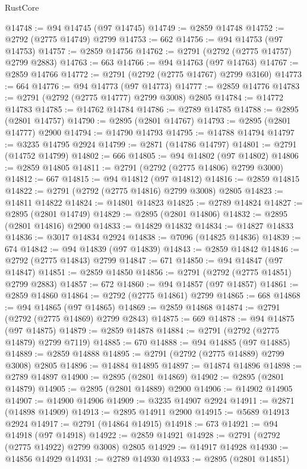 \begin{lexlean}{RustCore}
\begin{coremodule}
@14748 := @94 @14745 (@97 @14745)
@14749 := @2859 @14748
@14752 := @2792 (@2775 @14749) @2799
@14753 := 662
@14756 := @94 @14753 (@97 @14753)
@14757 := @2859 @14756
@14762 := @2791 (@2792 (@2775 @14757) @2799 @2883)
@14763 := 663
@14766 := @94 @14763 (@97 @14763)
@14767 := @2859 @14766
@14772 := @2791 (@2792 (@2775 @14767) @2799 @3160)
@14773 := 664
@14776 := @94 @14773 (@97 @14773)
@14777 := @2859 @14776
@14783 := @2791 (@2792 (@2775 @14777) @2799 @3008) @2805
@14784 := @14772 @14783
@14785 := @14762 @14784
@14786 := @2789 @14785
@14788 := @2895 (@2801 @14757)
@14790 := @2895 (@2801 @14767)
@14793 := @2895 (@2801 @14777) @2900
@14794 := @14790 @14793
@14795 := @14788 @14794
@14797 := @3235 @14795 @2924
@14799 := @2871 (@14786 @14797)
@14801 := @2791 (@14752 @14799)
@14802 := 666
@14805 := @94 @14802 (@97 @14802)
@14806 := @2859 @14805
@14811 := @2791 (@2792 (@2775 @14806) @2799 @3000)
@14812 := 667
@14815 := @94 @14812 (@97 @14812)
@14816 := @2859 @14815
@14822 := @2791 (@2792 (@2775 @14816) @2799 @3008) @2805
@14823 := @14811 @14822
@14824 := @14801 @14823
@14825 := @2789 @14824
@14827 := @2895 (@2801 @14749)
@14829 := @2895 (@2801 @14806)
@14832 := @2895 (@2801 @14816) @2900
@14833 := @14829 @14832
@14834 := @14827 @14833
@14836 := @3017 @14834 @2924
@14838 := @7096 (@14825 @14836)
@14839 := 674
@14842 := @94 @14839 (@97 @14839)
@14843 := @2859 @14842
@14846 := @2792 (@2775 @14843) @2799
@14847 := 671
@14850 := @94 @14847 (@97 @14847)
@14851 := @2859 @14850
@14856 := @2791 (@2792 (@2775 @14851) @2799 @2883)
@14857 := 672
@14860 := @94 @14857 (@97 @14857)
@14861 := @2859 @14860
@14864 := @2792 (@2775 @14861) @2799
@14865 := 668
@14868 := @94 @14865 (@97 @14865)
@14869 := @2859 @14868
@14874 := @2791 (@2792 (@2775 @14869) @2799 @2843)
@14875 := 669
@14878 := @94 @14875 (@97 @14875)
@14879 := @2859 @14878
@14884 := @2791 (@2792 (@2775 @14879) @2799 @7119)
@14885 := 670
@14888 := @94 @14885 (@97 @14885)
@14889 := @2859 @14888
@14895 := @2791 (@2792 (@2775 @14889) @2799 @3008) @2805
@14896 := @14884 @14895
@14897 := @14874 @14896
@14898 := @2789 @14897
@14900 := @2895 (@2801 @14869)
@14902 := @2895 (@2801 @14879)
@14905 := @2895 (@2801 @14889) @2900
@14906 := @14902 @14905
@14907 := @14900 @14906
@14909 := @3235 @14907 @2924
@14911 := @2871 (@14898 @14909)
@14913 := @2895 @14911 @2900
@14915 := @5689 @14913 @2924
@14917 := @2791 (@14864 @14915)
@14918 := 673
@14921 := @94 @14918 (@97 @14918)
@14922 := @2859 @14921
@14928 := @2791 (@2792 (@2775 @14922) @2799 @3008) @2805
@14929 := @14917 @14928
@14930 := @14856 @14929
@14931 := @2789 @14930
@14933 := @2895 (@2801 @14851)

\end{coremodule}
\end{lexlean}

